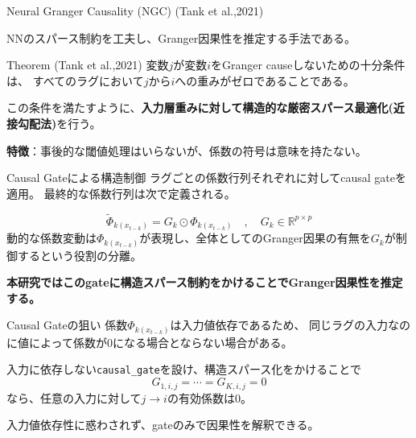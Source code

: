 \documentclass[dvipdfmx,11pt]{beamer}
\begin{document}
\begin{frame}{Neural Granger Causality (NGC) (Tank et al.,2021)}
  
  NNのスパース制約を工夫し、Granger因果性を推定する手法である。

  \vspace{0.5em}
  \begin{block}{Theorem (Tank et al.,2021)}
    変数$j$が変数$i$をGranger causeしないための十分条件は、
    すべてのラグにおいて$j$から$i$への重みがゼロであることである。
  \end{block}
  この条件を満たすように、\textbf{入力層重みに対して構造的な厳密スパース最適化(近接勾配法)}を行う。

  \vspace{1.0em}

  \begin{center}
    \textbf{特徴}：事後的な閾値処理はいらないが、係数の符号は意味を持たない。
  \end{center}
\end{frame}



\begin{frame}{Causal Gateによる構造制御}
 ラグごとの係数行列それぞれに対してcausal gateを適用。
 最終的な係数行列は次で定義される。

  \[
    \tilde{\Phi}_{k(x_{t-k})}
    =
    G_k \odot \Phi_{k(x_{t-k})} 
    \quad , \quad  
    G_k \in \mathbb{R}^{p \times p}
  \]
  \vspace{0.5em}
  動的な係数変動は$\Phi_{k(x_{t-k})}$が表現し、全体としてのGranger因果の有無を$G_k$が制御するという役割の分離。

  \vspace{0.5em}
  \center
    \textbf{本研究ではこのgateに構造スパース制約をかけることでGranger因果性を推定する。}
\end{frame}

\begin{frame}{Causal Gateの狙い}
  係数$\Phi_{k(x_{t-k})}$は入力値依存であるため、
  同じラグの入力なのに値によって係数が0になる場合とならない場合がある。

  \vspace{0.5em}
  入力に依存しない\texttt{causal\_gate}を設け、構造スパース化をかけることで
  \[
    G_{1,i,j}=\cdots=G_{K,i,j}=0
  \]
  なら、任意の入力に対して$j \to i$の有効係数は0。

  \vspace{0.5em}
  入力値依存性に惑わされず、gateのみで因果性を解釈できる。
\end{frame}
\end{document}

